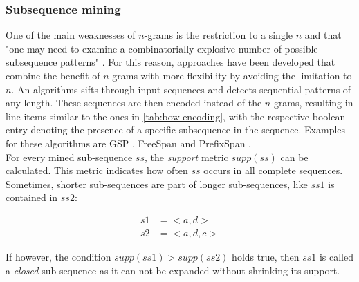\subsubsection*{Subsequence mining}
One of the main weaknesses of $n$-grams is the restriction to a single $n$ and that "one may need to examine a combinatorially explosive
number of possible subsequence patterns" \cite{pei2001prefixspan}. For this reason, approaches have been developed that combine the benefit of $n$-grams with more flexibility by avoiding the limitation to $n$. An algorithms sifts through input sequences and detects sequential patterns of any length. These sequences are then encoded instead of the $n$-grams, resulting in line items similar to the ones in \autoref{tab:bow-encoding}, with the respective boolean entry denoting the presence of a specific subsequence in the sequence. Examples for these algorithms are GSP \cite{srikant1996gsp}, FreeSpan \cite{han2000freespan} and PrefixSpan \cite{pei2001prefixspan}.\\

For every mined sub-sequence $ss$, the \textit{support} metric $supp(ss)$ can be calculated. This metric indicates how often $ss$ occurs in all complete sequences. Sometimes, shorter sub-sequences are part of longer sub-sequences, like $ss1$ is contained in $ss2$:

\begin{equation*}
\begin{split}
s1 &= <a,d>\\
s2 &= <a,d,c>
\end{split}
\end{equation*}

If however, the condition $supp(ss1)>supp(ss2)$ holds true, then $ss1$ is called a \textit{closed} sub-sequence as it can not be expanded without shrinking its support.